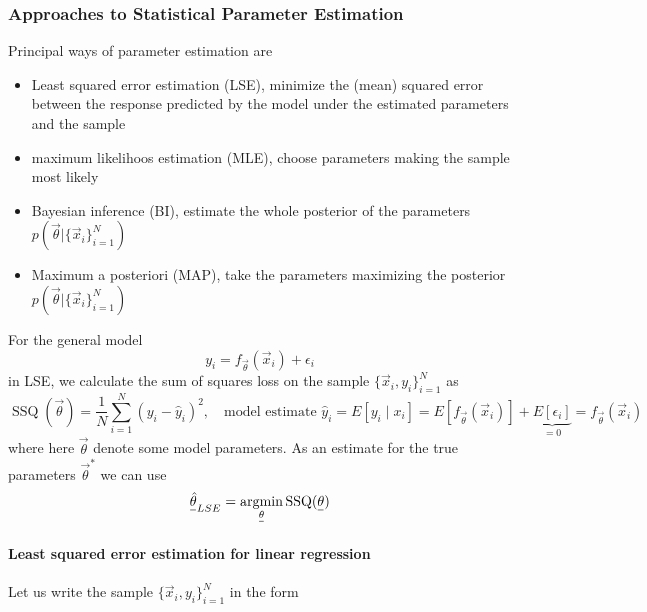 \subsubsection{Approaches to Statistical Parameter Estimation}

Principal ways of parameter estimation are
\begin{itemize}
    \item Least squared error estimation (LSE), minimize the (mean) squared error between the response predicted by the model under the estimated parameters and the sample
    \item maximum likelihoos estimation (MLE), choose parameters making the sample most likely
    \item Bayesian inference (BI), estimate the whole posterior of the parameters $p(\vec{\theta}|\{\vec{x}_i\}_{i=1}^N)$
    \item Maximum a posteriori (MAP), take the parameters maximizing the posterior $p(\vec{\theta}|\{\vec{x}_i\}_{i=1}^N)$
\end{itemize}

For the general model
\begin{equation}
    y_i = f_\vec{\theta}(\vec{x}_i) + \epsilon_i
\end{equation}
in LSE, we calculate the sum of squares loss on the sample $\{ \vec{x}_i,y_i \}_{i=1}^N$ as
\begin{equation}
    \operatorname{SSQ}(\vec{\theta}) = \frac{1}{N} \sum_{i=1}^{N} (y_i - \hat{y}_i)^2, \quad \text{model estimate } \hat{y}_i = E\left[y_i \mid x_i\right]=E\left[f_{\vec{\theta}}\left(\vec{x}_i\right)\right]+\underbrace{E\left[\epsilon_i\right]}_{=0}=f_{\vec{\theta}}\left(\vec{x}_i\right)
\end{equation}
where here $\vec{\theta}$ denote some model parameters. As an estimate for the true parameters $\vec{\theta}^*$ we can use
\begin{equation}
    \vec{\hat{\theta}}_{LSE} = \argmin_{\vec{\theta}} \operatorname{SSQ}(\vec{\theta})
\end{equation}

\paragraph*{Least squared error estimation for linear regression} Let us write the sample $\{ \vec{x}_i,y_i \}_{i=1}^N$ in the form

